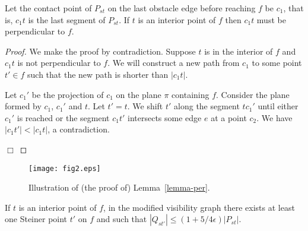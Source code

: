 \documentclass{llncs}
\begin{document}
\begin{lemma}
\label{lemma-per}
Let the contact point of $P_{st}$ on the last obstacle edge before reaching $f$ be $c_1$, that is,
$c_1t$ is the last segment of $P_{st}$. If $t$ is an interior point of $f$ then
$c_1t$ must be perpendicular to $f$.
\end{lemma}

\begin{proof}
We make the proof by contradiction. Suppose $t$ is in the interior of $f$ and $c_1t$ is
not perpendicular to $f$. We will construct a new path from $c_1$ to some point $t'\in f$
such that the new path is shorter than $|c_1t|$.

Let $c_1'$ be the projection of $c_1$ on the plane $\pi$ containing $f$. Consider the plane
formed by $c_1$, $c_1'$ and $t$. Let $t'=t$. We shift $t'$ along the segment $tc_1'$ until either $c_1'$ is
reached or the segment $c_1t'$ intersects some edge $e$ at a point $c_2$. We have $|c_1t'|<|c_1t|$, a contradiction.

\hfill $\Box$
\end{proof}
\begin{figure}\vspace*{-0.35in}
    \begin{center}
    \leavevmode
\texttt{[image: fig2.eps]}
    \caption{Illustration of (the proof of) Lemma~\ref{lemma-per}.}
    \label{fig2}
    \end{center}
    \vspace*{-0.35in}
\end{figure}


\begin{lemma}
\label{lemma-interior}
If $t$ is an interior point of $f$, in the modified visibility graph there exists at least one Steiner
point $t'$ on $f$ and such that $|Q_{st'}|\le(1+5/4\epsilon)|P_{st}|$.
\end{lemma}
\end{document}
